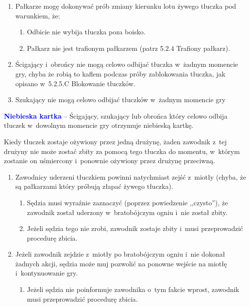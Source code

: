 \documentclass[12pt,a4paper]{article}
\renewcommand{\subsubsection}[1]{
  \oldsubsubsection{#1}%
  \leftskip1.5cm
}
\newcommand\bluecard[1]{\bgroup\textcolor{blue}{\textbf{#1}}}
\begin{document}
\begin{enumerate}
	\item
	      Pałkarze mogę dokonywać prób zmiany kierunku lotu żywego tłuczka pod
	      warunkiem, że:

	      \begin{enumerate}
		      \item
		            Odbicie nie wybija tłuczka poza boisko.
		      \item
		            Pałkarz nie jest trafionym pałkarzem (patrz 5.2.4 Trafiony pałkarz).
	      \end{enumerate}
	\item
	      Ścigający i~obrońcy nie mogą celowo odbijać tłuczka w~żadnym momencie
	      gry, chyba że robią to kaflem podczas próby zablokowania tłuczka, jak
	      opisano w~5.2.5.C Blokowanie tłuczków.
	\item
	      Szukający nie mogą celowo odbijać tłuczków w~żadnym momencie gry
\end{enumerate}

\bluecard{Niebieska kartka} -- Ścigający, szukający lub obrońca który celowo
odbija tłuczek w~dowolnym momencie gry otrzymuje niebieską kartkę.

\subsubsection{Bratobójczy ogień}

Kiedy tłuczek zostaje ożywiony przez jedną drużynę, żaden zawodnik z~tej
drużyny nie może zostać zbity za pomocą tego tłuczka do momentu, w~którym zostanie on uśmiercony i~ponownie ożywiony przez drużynę
przeciwną.

\begin{enumerate}
	\item
	      Zawodnicy uderzeni tłuczkiem powinni natychmiast zejść z~miotły
	      (chyba, że są pałkarzami który próbują złapać żywego tłuczka).

	      \begin{enumerate}
		      \item
		            Sędzia musi wyraźnie zaznaczyć (poprzez powiedzenie ,,czysto''), że
		            zawodnik został uderzony w~bratobójczym ogniu i~nie został zbity.
		      \item
		            Jeżeli sędzia tego nie zrobi, zawodnik zostaje zbity i~musi
		            przeprowadzić procedurę zbicia.
	      \end{enumerate}
	\item
	      Jeżeli zawodnik zejdzie z~miotły po bratobójczym ogniu i~nie dokonał
	      żadnych akcji, sędzia może muj pozwolić na ponowne wejście na miotłę i~kontynuowanie gry.

	      \begin{enumerate}
		      \item
		            Jeżeli sędzia nie poinformuje zawodnika o~tym fakcie wprost,
		            zawodnik musi przeprowadzić procedurę zbicia.
	      \end{enumerate}
\end{enumerate}
\end{document}
